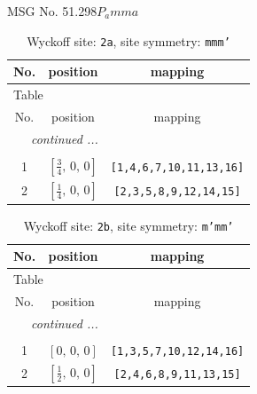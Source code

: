 \documentclass[fleqn,8pt]{jsarticle}
\begin{document}
\setcounter{MaxMatrixCols}{32}

\renewcommand{\tablename}{Table~}
\renewcommand{\figurename}{Figure~}
\begin{center}
\LARGE
MSG No. 51.298\quad$P_{a}mma$
\end{center}
\renewcommand{\arraystretch}{1.2}
\begin{longtable}{ccc}
\caption{Wyckoff site: {\tt 2a}, site symmetry: {\tt mmm'}}
 \\
 \hline \hline
No. & position & mapping \\ \hline \endfirsthead

\multicolumn{2}{l}{\tablename\ \thetable{}} \\
 \hline \hline
No. & position & mapping \\ \hline \endhead

 \hline \hline
\multicolumn{2}{r}{\footnotesize\it continued ...} \\ \endfoot

 \hline \hline
\multicolumn{2}{r}{} \\ \endlastfoot

1 & $\left[ \frac{3}{4},\, 0,\, 0 \right]$ & {\tt [1,4,6,7,10,11,13,16]} \\ \hline
2 & $\left[ \frac{1}{4},\, 0,\, 0 \right]$ & {\tt [2,3,5,8,9,12,14,15]} \\
\end{longtable}
\renewcommand{\arraystretch}{1.2}
\begin{longtable}{ccc}
\caption{Wyckoff site: {\tt 2b}, site symmetry: {\tt m'mm'}}
 \\
 \hline \hline
No. & position & mapping \\ \hline \endfirsthead

\multicolumn{2}{l}{\tablename\ \thetable{}} \\
 \hline \hline
No. & position & mapping \\ \hline \endhead

 \hline \hline
\multicolumn{2}{r}{\footnotesize\it continued ...} \\ \endfoot

 \hline \hline
\multicolumn{2}{r}{} \\ \endlastfoot

1 & $\left[ 0,\, 0,\, 0 \right]$ & {\tt [1,3,5,7,10,12,14,16]} \\ \hline
2 & $\left[ \frac{1}{2},\, 0,\, 0 \right]$ & {\tt [2,4,6,8,9,11,13,15]} \\
\end{longtable}
\end{document}
